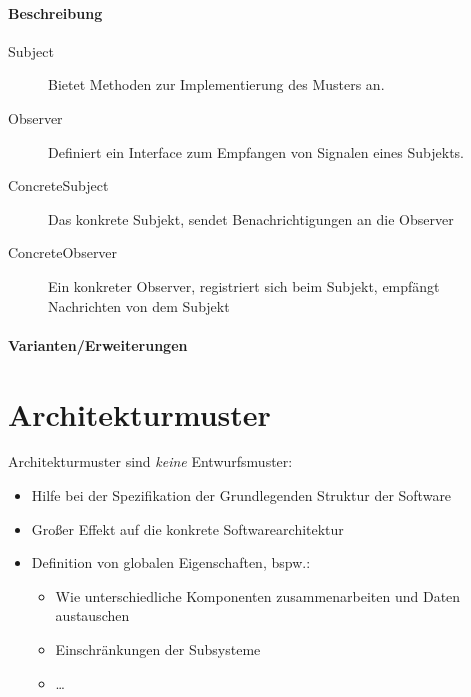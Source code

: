 \documentclass[a4paper, 11pt, accentcolor = tud3b]{tudreport}
\begin{document}
				\paragraph{Beschreibung}
					\begin{description}
						\item[Subject] Bietet Methoden zur Implementierung des Musters an.
						\item[Observer] Definiert ein Interface zum Empfangen von Signalen eines Subjekts.
						\item[ConcreteSubject] Das konkrete Subjekt, sendet Benachrichtigungen an die Observer
						\item[ConcreteObserver] Ein konkreter Observer, registriert sich beim Subjekt, empfängt Nachrichten von dem Subjekt
					\end{description}
				
				\paragraph{Varianten/Erweiterungen}
		
		\section{Architekturmuster}
			Architekturmuster sind \textit{keine} Entwurfsmuster:
			\begin{itemize}
				\item Hilfe bei der Spezifikation der Grundlegenden Struktur der Software
				\item Großer Effekt auf die konkrete Softwarearchitektur
				\item Definition von globalen Eigenschaften, bspw.:
					\begin{itemize}
						\item Wie unterschiedliche Komponenten zusammenarbeiten und Daten austauschen
						\item Einschränkungen der Subsysteme
						\item \dots
					\end{itemize}
			\end{itemize}
\end{document}
